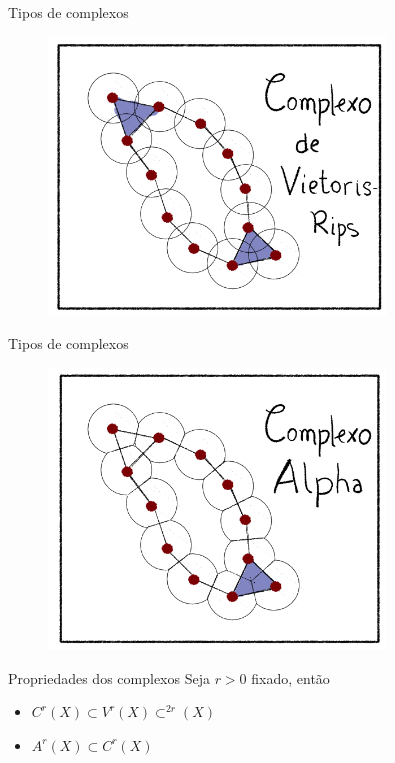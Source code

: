 \documentclass[10pt]{beamer}
\begin{document}
\begin{frame}{Tipos de complexos}
    \begin{figure}
        \centering
        \includegraphics[width=0.8\textwidth]{../images/ComplexRips.png}
    \end{figure}   
\end{frame}

\begin{frame}{Tipos de complexos}
    \begin{figure}
        \centering
        \includegraphics[width=0.8\textwidth]{../images/ComplexAlpha.png}
    \end{figure}   
\end{frame}

\begin{frame}{Propriedades dos complexos}
    Seja $r > 0$ fixado, então
    \begin{itemize}
        \item $C^r(X) \subset V^r(X) \subset^{2r}(X)$
        \item $A^r(X) \subset C^r(X)$
    \end{itemize} 
\end{frame}
\end{document}
